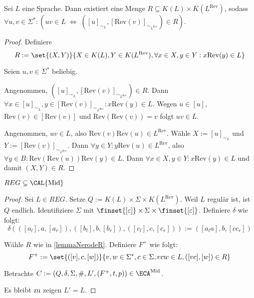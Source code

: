\newcommand{\rev}{\mathrm{Rev}}
\newcommand{\equivcl}[2]{[{#1}]_{\sim_{#2}}}

\begin{lemma}
    \label{lemmaNerodeR}
    Sei $L$ eine Sprache. Dann existiert eine Menge $R \subseteq K(L) \times K(L^\rev)$, sodass $\forall u, v \in \Sigma^*: (uv \in L \; \Leftrightarrow \; (\equivcl{u}{L}, \equivcl{\rev(v)}{L^\rev}) \in R)$.
\end{lemma}
\begin{proof}
    Definiere
    \[
        R := \set{(X, Y)}{ X \in K(L), Y \in K(L^\rev), \forall x \in X, y \in Y: x \rev(y) \in L }
    \]
    
    Seien $u, v \in \Sigma^*$ beliebig.
    
    Angenommen, $(\equivcl{u}{L}, \equivcl{\rev(v)}{L^\rev}) \in R$.
    Dann $\forall x \in \equivcl{u}{L}, y \in \equivcl{\rev(v)}{L^\rev}: x\rev(y) \in L$.
    Wegen $u \in [u]$, $\rev(v) \in [\rev(v)]$ und $\rev(\rev(v)) = v$ folgt $uv \in L$.
    
    Angenommen, $uv \in L$, also $\rev(v)\rev(u) \in L^\rev$.
    Wähle $X := \equivcl{u}{L}$ und $Y := \equivcl{\rev(v)}{L^\rev}$.
    Dann $\forall y \in Y: y\rev(u) \in L^\rev$, also $\forall y \in B: \rev(\rev(u))\rev(y) \in L$.
    Dann $\forall x \in X, y \in Y: x\rev(y) \in L$ und damit $(X, Y) \in R$.
\end{proof}

\begin{satz}
    $REG \subsetneq \CAL{\mathrm{Mid}}$
\end{satz}
\begin{proof}
    Sei $L \in REG$. Setze $Q := K(L) \times \Sigma \times K(L^\rev)$. Weil $L$ regulär ist, ist $Q$ endlich.
    Identifiziere $\Sigma$ mit $\finset{ [\varepsilon] } \times \Sigma \times \finset{ [\varepsilon] }$.
    Definiere $\delta$ wie folgt:
    \[
        \delta(([a_l], a, [a_r]), ([b_l], b, [b_r]), ([c_l], c, [c_r])) := ([a_l a], b, [c c_r])
    \]
    
    Wähle $R$ wie in \cref{lemmaNerodeR}.
    Definiere $F^+$ wie folgt:
    \[
        F^+ := \set{ ([ v ], c, [ w ]) }{ v, w \in \Sigma^*, c \in \Sigma, vcw \in L, ([ vc ], [ w ]) \in R }
    \]
    
    Betrachte $C := (Q, \delta, \Sigma, \#, L', (F^+, t, p)) \in \ECA^{\textrm{Mid}}$.
    
    Es bleibt zu zeigen $L' = L$.
\end{proof}
